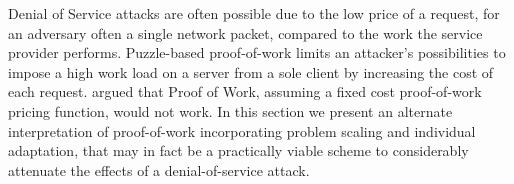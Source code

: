 %
%

Denial of Service attacks are often possible due to the low price of a request, for an adversary often a single network packet\cite{gunter}, compared to the work the service provider performs. Puzzle-based proof-of-work limits an attacker's possibilities to impose a high work load on a server from a sole client by increasing the cost of each request.  argued that Proof of Work, assuming a fixed cost proof-of-work pricing function, would not work. In this section we present an alternate interpretation of proof-of-work incorporating problem scaling and individual adaptation, that may in fact be a practically viable scheme to considerably attenuate the effects of a denial-of-service attack.

